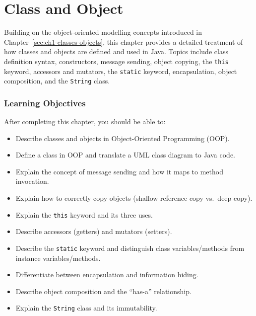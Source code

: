 \documentclass[11pt, a4paper, notitlepage]{report}
\theoremstyle{definition}
\theoremstyle{remark}
\theoremstyle{definition}
\begin{document}


\chapter{Class and Object}
\label{chap:class-and-object}

Building on the object-oriented modelling concepts introduced in Chapter~\ref{sec:ch1-classes-objects}, this chapter provides a detailed treatment of how classes and objects are defined and used in Java. Topics include class definition syntax, constructors, message sending, object copying, the \texttt{this} keyword, accessors and mutators, the \texttt{static} keyword, encapsulation, object composition, and the \texttt{String} class.

\subsection{Learning Objectives}
\label{sec:ch2-objectives}

After completing this chapter, you should be able to:
\begin{itemize}[noitemsep]
  \item Describe classes and objects in Object-Oriented Programming (OOP).
  \item Define a class in OOP and translate a UML class diagram to Java code.
  \item Explain the concept of message sending and how it maps to method invocation.
  \item Explain how to correctly copy objects (shallow reference copy vs.\ deep copy).
  \item Explain the \texttt{this} keyword and its three uses.
  \item Describe accessors (getters) and mutators (setters).
  \item Describe the \texttt{static} keyword and distinguish class variables/methods from instance variables/methods.
  \item Differentiate between encapsulation and information hiding.
  \item Describe object composition and the ``has-a'' relationship.
  \item Explain the \texttt{String} class and its immutability.
\end{itemize}
\end{document}
